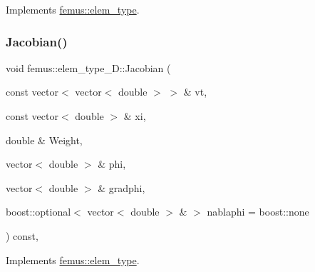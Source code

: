 Implements \mbox{\hyperlink{classfemus_1_1elem__type_a2d76133387cebf896c0e51459055fdea}{femus\+::elem\+\_\+type}}.

\mbox{\label{classfemus_1_1elem__type__2_d_a0194ae2956bdb2aaf843e05477ac3684}} 
\subsubsection{\texorpdfstring{Jacobian()}{Jacobian()}\hspace{0.1cm}{\footnotesize\ttfamily [4/4]}}
{\footnotesize\ttfamily void femus\+::elem\+\_\+type\+\_\+D\+::\+Jacobian (\begin{DoxyParamCaption}\item[{const vector$<$ vector$<$ double $>$ $>$ \&}]{vt,  }\item[{const vector$<$ double $>$ \&}]{xi,  }\item[{double \&}]{Weight,  }\item[{vector$<$ double $>$ \&}]{phi,  }\item[{vector$<$ double $>$ \&}]{gradphi,  }\item[{boost\+::optional$<$ vector$<$ double $>$ \& $>$}]{nablaphi = {\ttfamily boost\+:\+:none} }\end{DoxyParamCaption}) const\hspace{0.3cm}{\ttfamily [inline]}, {\ttfamily [virtual]}}



Implements \mbox{\hyperlink{classfemus_1_1elem__type_aab6db5851a9810adfe0ff98df2c30810}{femus\+::elem\+\_\+type}}.

\mbox{\label{classfemus_1_1elem__type__2_d_aa4bc7ea3d9b10300367ad23b3ce4f977}} 
